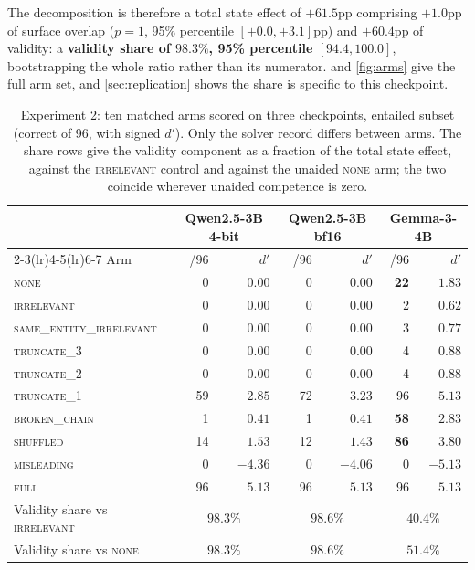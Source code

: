 \documentclass[10pt,twocolumn]{article}
\begin{document}
The decomposition is therefore a total state effect of $+61.5$pp comprising
$+1.0$pp of surface overlap ($p = 1$, 95\% percentile $[+0.0, +3.1]$pp) and $+60.4$pp of
validity: a \textbf{validity share of $98.3\%$, 95\% percentile $[94.4, 100.0]$},
bootstrapping the whole ratio rather than its numerator.  and
\cref{fig:arms} give the full arm set, and \cref{sec:replication} shows the
share is specific to this checkpoint.

\begin{table}[tb]
\centering\small
\caption{Experiment 2: ten matched arms scored on three checkpoints, entailed
subset (correct of 96, with signed $d'$). Only the solver record differs between
arms. The share rows give the validity component as a fraction of the total state
effect, against the \textsc{irrelevant} control and against the unaided
\textsc{none} arm; the two coincide wherever unaided competence is zero.}
\label{tab:arms}
\begin{tabular}{lrrrrrr}
\toprule
& \multicolumn{2}{c}{Qwen2.5-3B 4-bit} & \multicolumn{2}{c}{Qwen2.5-3B bf16}
& \multicolumn{2}{c}{Gemma-3-4B} \\
\cmidrule(lr){2-3}\cmidrule(lr){4-5}\cmidrule(lr){6-7}
Arm & /96 & $d'$ & /96 & $d'$ & /96 & $d'$ \\
\midrule
\textsc{none}                    &  0 & $0.00$ &  0 & $0.00$ & \textbf{22} & $1.83$ \\
\textsc{irrelevant}              &  0 & $0.00$ &  0 & $0.00$ &  2 & $0.62$ \\
\textsc{same\_entity\_irrelevant}&  0 & $0.00$ &  0 & $0.00$ &  3 & $0.77$ \\
\textsc{truncate\_3}             &  0 & $0.00$ &  0 & $0.00$ &  4 & $0.88$ \\
\textsc{truncate\_2}             &  0 & $0.00$ &  0 & $0.00$ &  4 & $0.88$ \\
\textsc{truncate\_1}             & 59 & $2.85$ & 72 & $3.23$ & 96 & $5.13$ \\
\textsc{broken\_chain}           &  1 & $0.41$ &  1 & $0.41$ & \textbf{58} & $2.83$ \\
\textsc{shuffled}                & 14 & $1.53$ & 12 & $1.43$ & \textbf{86} & $3.80$ \\
\textsc{misleading}              &  0 & $-4.36$ &  0 & $-4.06$ &  0 & $-5.13$ \\
\textsc{full}                    & 96 & $5.13$ & 96 & $5.13$ & 96 & $5.13$ \\
\midrule
Validity share vs \textsc{irrelevant} & \multicolumn{2}{c}{$98.3\%$}
 & \multicolumn{2}{c}{$98.6\%$} & \multicolumn{2}{c}{$\mathbf{40.4\%}$} \\
Validity share vs \textsc{none}       & \multicolumn{2}{c}{$98.3\%$}
 & \multicolumn{2}{c}{$98.6\%$} & \multicolumn{2}{c}{$\mathbf{51.4\%}$} \\
\bottomrule
\end{tabular}
\end{table}
\end{document}
